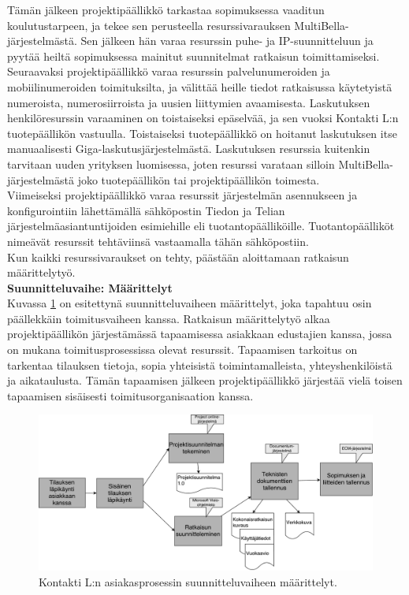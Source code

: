 \documentclass[finnish,12pt,a4paper,pdftex]{article}
\begin{document}
Tämän jälkeen projektipäällikkö tarkastaa sopimuksessa vaaditun koulutustarpeen, ja tekee sen perusteella resurssivarauksen MultiBella-järjestelmästä. Sen jälkeen hän varaa resurssin puhe- ja IP-suunnitteluun ja pyytää heiltä sopimuksessa mainitut suunnitelmat ratkaisun toimittamiseksi.\\

Seuraavaksi projektipäällikkö varaa resurssin palvelunumeroiden ja mobiilinumeroiden toimituksilta, ja välittää heille tiedot ratkaisussa käytetyistä numeroista, numerosiirroista ja uusien liittymien avaamisesta. Laskutuksen henkilöresurssin varaaminen on toistaiseksi epäselvää, ja sen vuoksi Kontakti L:n tuotepäällikön vastuulla. Toistaiseksi tuotepäällikkö on hoitanut laskutuksen itse manuaalisesti Giga-laskutusjärjestelmästä. Laskutuksen resurssia kuitenkin tarvitaan uuden yrityksen luomisessa, joten resurssi varataan silloin MultiBella-järjestelmästä joko tuotepäällikön tai projektipäällikön toimesta.\\

Viimeiseksi projektipäällikkö varaa resurssit järjestelmän asennukseen ja konfigurointiin lähettämällä sähköpostin Tiedon ja Telian järjestelmäasiantuntijoiden esimiehille eli tuotantopäälliköille. Tuotantopäälliköt nimeävät resurssit tehtäviinsä vastaamalla tähän sähköpostiin.\\

Kun kaikki resurssivaraukset on tehty, päästään aloittamaan ratkaisun määrittelytyö.\\

\textbf{Suunnitteluvaihe: Määrittelyt}\\

Kuvassa \ref{fig:maarittely} on esitettynä suunnitteluvaiheen määrittelyt, joka tapahtuu osin päällekkäin toimitusvaiheen kanssa. Ratkaisun määrittelytyö alkaa projektipäällikön järjestämässä tapaamisessa asiakkaan edustajien kanssa, jossa on mukana toimitusprosessissa olevat resurssit. Tapaamisen tarkoitus on tarkentaa tilauksen tietoja, sopia yhteisistä toimintamalleista, yhteyshenkilöistä ja aikataulusta. Tämän tapaamisen jälkeen projektipäällikkö järjestää vielä toisen tapaamisen sisäisesti toimitusorganisaation kanssa.\\

\begin{figure}[!h]
    \centering
    \includegraphics[scale=0.25]{images/maarittely.pdf}
    \caption{Kontakti L:n asiakasprosessin suunnitteluvaiheen määrittelyt.}
    \label{fig:maarittely}
\end{figure}
\end{document}
